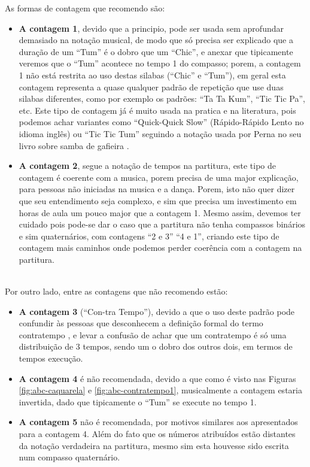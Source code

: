 As formas de contagem que recomendo são:
\begin{itemize}
\item \textbf{A contagem 1}, 
devido que a principio, pode ser usada sem aprofundar demasiado 
na notação musical, de modo que só precisa ser explicado que a duração de um 
``Tum'' é o dobro que um ``Chic'', e anexar que tipicamente veremos que o ``Tum''
acontece no tempo 1 do compasso; 
porem, a contagem 1 não está restrita ao uso destas silabas (``Chic'' e ``Tum''), 
em geral esta contagem representa a quase qualquer padrão de repetição
que use duas silabas diferentes, como por exemplo os padrões: ``Ta Ta Kum'', ``Tic Tic Pa'', etc. 
Este tipo de contagem já é muito usada na pratica e na literatura, pois 
podemos achar variantes como ``Quick-Quick Slow'' (Rápido-Rápido Lento no idioma inglês)
ou ``Tic Tic Tum'' seguindo a notação usada por Perna no seu livro sobre samba de gafieira \cite[pp. 146]{perna2002samba}.
\item \textbf{A contagem 2}, segue a notação de tempos na partitura, este tipo de
contagem é coerente com a musica, porem precisa de uma major explicação, 
para pessoas não iniciadas na musica e a dança. Porem, isto não quer dizer que seu
entendimento seja complexo, e sim que precisa um investimento em horas de aula
um pouco major que a contagem 1.
Mesmo assim, devemos ter cuidado pois pode-se dar o caso que a partitura não tenha compassos binários 
e sim quaternários, com contagens ``2 e 3'' ``4 e 1'', 
criando este tipo de contagem mais caminhos onde podemos perder coerência com a contagem na partitura.
\end{itemize}

~\\

Por outro lado, entre as contagens que não recomendo estão:
\begin{itemize}
\item \textbf{A contagem 3} (``Con-tra Tempo''), 
devido a que o uso deste padrão pode confundir às pessoas que desconhecem 
a definição formal do termo contratempo \cite[pp. 16]{mascarenhascurso} \cite[pp. 36]{azevedocompor}, 
e levar a confusão de achar que um contratempo é só uma distribuição de 3 tempos, 
sendo um o dobro dos outros dois, em termos de tempos execução.
\item \textbf{A contagem 4} é não recomendada, devido a que como é visto nas Figuras 
\ref{fig:abc-caquarela} e \ref{fig:abc-contratempo1}, musicalmente a contagem estaria invertida,
dado que tipicamente o ``Tum'' se execute no tempo 1.

\item \textbf{A contagem 5} não é recomendada, 
por motivos similares aos apresentados para a contagem 4. 
Além do fato que os números atribuídos estão distantes da
notação verdadeira na partitura, mesmo sim esta houvesse sido escrita num compasso quaternário.
\end{itemize}


